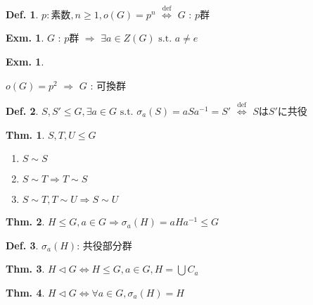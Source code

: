 \documentclass[uplatex,dvipdfmx,9pt]{beamer}
\newcommand{\defarrow}{\overset{\mathrm{def}}{\Leftrightarrow}}
\newcommand{\nsubgroup}{\vartriangleleft} %
\newcommand{\inverse}[1]{#1^{-1}}
\newcommand{\st}{\text{ s.t. }}
\newcounter{textExmCount}
\theoremstyle{definition} %
\newtheorem{defn}{Def.}[subsection] %
\newtheorem{thm}{Thm.}[subsection] %
\theoremstyle{example}
\newtheorem{exmText}[textExmCount]{Exm.}
\begin{document}
      \begin{frame}

        \begin{defn}
          $p: \text{素数}, n \ge 1, o(G) = p^n$ $\defarrow$ $G$ : \alert{$p$群}
        \end{defn}
        
        \begin{exmText}
          $G$ : $p$群 $\Rightarrow$ $\exists a \in Z(G) \st a \ne e$
        \end{exmText}

        \begin{exmText}
          \hypertarget{exmText7-3}{}
          $o(G) = p^2$ $\Rightarrow$ $G$ : 可換群
        \end{exmText}
        
        \begin{defn}
          $S, S' \le G, \exists a \in G \st \sigma_a(S) = aS\inverse{a} = S'$ $\defarrow$ $S$は$S'$に\alert{共役}
        \end{defn}

        \begin{thm}
          $S, T, U \le G$
          \begin{enumerate}
            \item $S \sim S$
            \item $S \sim T \Rightarrow T \sim S$
            \item $S \sim T, T \sim U \Rightarrow S \sim U$
          \end{enumerate}
        \end{thm}

      \end{frame}

      \begin{frame}

        \begin{thm}
          $H \le G, a \in G \Rightarrow \sigma_a(H) = aH\inverse{a} \le G$
        \end{thm}

        \begin{defn}
          $\sigma_a(H)$: \alert{共役部分群}
        \end{defn}

        \begin{thm}
          $H \nsubgroup G \Leftrightarrow H \le G, a \in G, H = \bigcup C_a$
        \end{thm}

        \begin{thm}
          $H \nsubgroup G \Leftrightarrow \forall a \in G, \sigma_a(H) = H$
        \end{thm}
      \end{frame}
\end{document}
